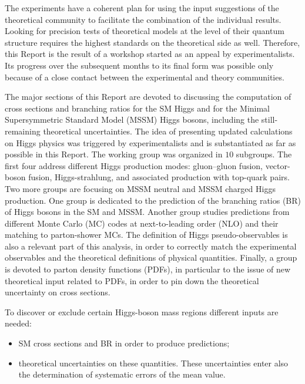 The experiments have a coherent plan for using the input suggestions
of the theoretical community to facilitate the combination of the 
individual results. Looking for precision tests of theoretical models 
at the level of their quantum structure requires the highest standards on the 
theoretical side as well.
Therefore, this Report is the result of a workshop started as an appeal
by experimentalists. Its progress over the subsequent months to its 
final form was possible only because of a close contact between the 
experimental and theory communities. 

The major sections of this Report are devoted to discussing the
computation of cross sections and branching ratios for the SM 
Higgs and for the Minimal Supersymmetric Standard Model (MSSM) Higgs bosons,
including the still-remaining theoretical uncertainties. 
The idea of presenting updated calculations on Higgs physics was triggered by 
experimentalists and is substantiated as far as possible in this Report.
The working group was organized in $10$ subgroups. The first four 
address different Higgs production modes: gluon--gluon fusion, 
vector-boson fusion, Higgs-strahlung, and associated production with 
top-quark pairs. Two more groups are focusing on MSSM neutral and MSSM charged 
Higgs production. One group is dedicated to the prediction of the 
branching ratios (BR) of Higgs bosons in the
SM and MSSM. Another group studies predictions from
different Monte Carlo (MC) codes at next-to-leading order (NLO) and  
their matching to parton-shower MCs. The definition of 
Higgs pseudo-observables is also a relevant part of this analysis, in 
order to correctly match the experimental observables and the 
theoretical definitions of physical quantities.
Finally, a group is devoted to parton density functions (PDFs), 
in particular to the issue of new theoretical input related to PDFs, 
in order to pin down the theoretical uncertainty on cross sections.

To  discover or exclude certain Higgs-boson mass regions 
different inputs are needed:
\begin{itemize}
\item SM cross sections and BR in order to produce predictions;
\item theoretical uncertainties on these quantities. These 
uncertainties enter also the determination of systematic errors of the 
mean value.
\end{itemize}


